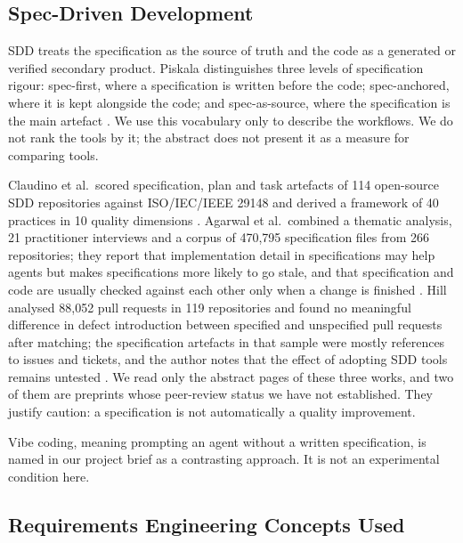 \documentclass[conference]{IEEEtran}
\begin{document}
\subsection{Spec-Driven Development}\label{spec-driven-development}

SDD treats the specification as the source of truth and the code as a
generated or verified secondary product. Piskala distinguishes three
levels of specification rigour: spec-first, where a specification is
written before the code; spec-anchored, where it is kept alongside the
code; and spec-as-source, where the specification is the main artefact
\cite{piskala2026}. We use this vocabulary only to describe the
workflows. We do not rank the tools by it; the abstract does not present
it as a measure for comparing tools.

Claudino et al.~scored specification, plan and task artefacts of 114
open-source SDD repositories against ISO/IEC/IEEE 29148 and derived a
framework of 40 practices in 10 quality dimensions \cite{claudino2026}.
Agarwal et al.~combined a thematic analysis, 21 practitioner interviews
and a corpus of 470,795 specification files from 266 repositories; they
report that implementation detail in specifications may help agents but
makes specifications more likely to go stale, and that specification and
code are usually checked against each other only when a change is
finished \cite{agarwal2026}. Hill analysed 88,052 pull requests in 119
repositories and found no meaningful difference in defect introduction
between specified and unspecified pull requests after matching; the
specification artefacts in that sample were mostly references to issues
and tickets, and the author notes that the effect of adopting SDD tools
remains untested \cite{hill2026}. We read only the abstract pages of
these three works, and two of them are preprints whose peer-review
status we have not established. They justify caution: a specification is
not automatically a quality improvement.

Vibe coding, meaning prompting an agent without a written specification,
is named in our project brief as a contrasting approach. It is not an
experimental condition here.

\subsection{Requirements Engineering Concepts
Used}\label{requirements-engineering-concepts-used}
\end{document}
